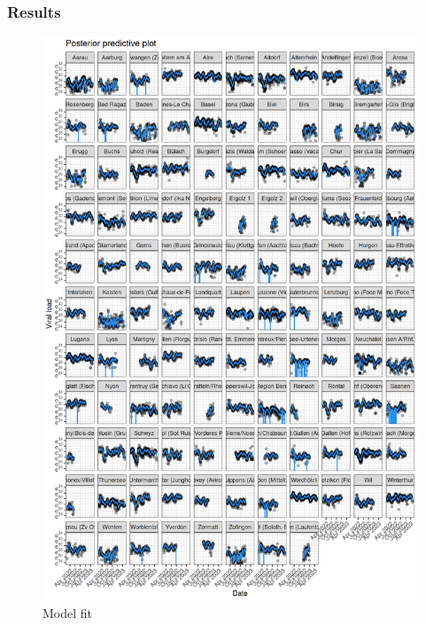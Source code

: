 \documentclass[10pt]{beamer}
\begin{document}
	\begin{frame}
		\frametitle{Results}
		\begin{figure}
			\includegraphics[width=0.5\linewidth]{../reports/model_dev_A3_files/figure-html/ma5.3.2a-1}
			\caption{Model fit}
		\end{figure}

%		
		
	\end{frame}
	
\end{document}
